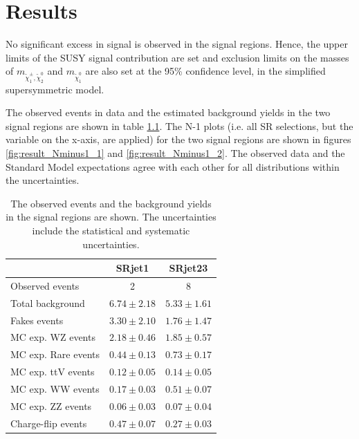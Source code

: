 \chapter{Results}
\label{ch:result}

No significant excess in signal is observed in the signal regions.
Hence, the upper limits of the SUSY signal contribution are set and exclusion limits on the masses of $m_{\tilde{\chi}_1^\pm, \tilde{\chi}_2^0}$ and $m_{\tilde{\chi}_1^0}$ are also set at the 95\% confidence level, in the simplified supersymmetric model.

The observed events in data and the estimated background yields in the two signal regions are shown in table \ref{tab:result_SR_result}.
The N-1 plots (i.e. all SR selections, but the variable on the x-axis, are applied) for the two signal regions are shown in figures \ref{fig:result_Nminus1_1} and \ref{fig:result_Nminus1_2}.
The observed data and the Standard Model expectations agree with each other for all distributions within the uncertainties.

\begin{table}[htbp]
\begin{center}
\begin{tabular}{|l|c|c|}
\hline
 & SRjet1 & SRjet23 \\
\hline
\hline
Observed events & 2 & 8 \\
\hline
Total background    & $6.74 \pm 2.18$ & $5.33 \pm 1.61$ \\
\hline
Fakes events        & $3.30 \pm 2.10$ & $1.76 \pm 1.47$ \\
MC exp. WZ events   & $2.18 \pm 0.46$ & $1.85 \pm 0.57$ \\
MC exp. Rare events & $0.44 \pm 0.13$ & $0.73 \pm 0.17$ \\
MC exp. ttV events  & $0.12 \pm 0.05$ & $0.14 \pm 0.05$ \\
MC exp. WW events   & $0.17 \pm 0.03$ & $0.51 \pm 0.07$ \\
MC exp. ZZ events   & $0.06 \pm 0.03$ & $0.07 \pm 0.04$ \\
Charge-flip events  & $0.47 \pm 0.07$ & $0.27 \pm 0.03$ \\
\hline
\end{tabular}
\caption{The observed events and the background yields in the signal regions are shown. The uncertainties include the statistical and systematic uncertainties.}
\label{tab:result_SR_result}
\end{center}
\end{table}

